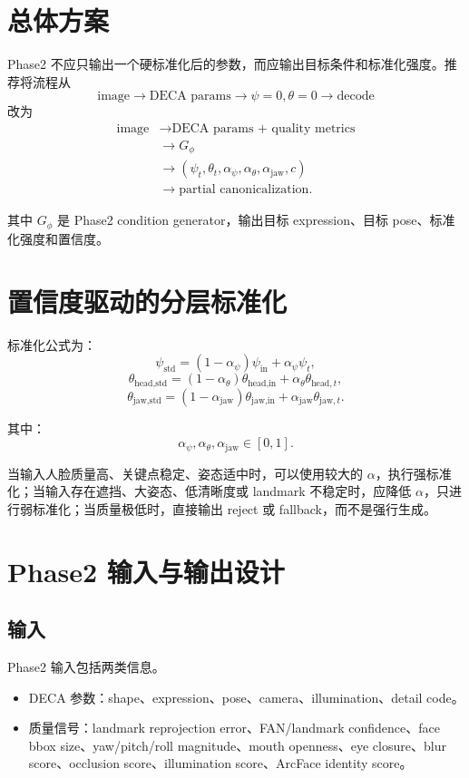 \documentclass[UTF8,12pt,fontset=fandol]{ctexart}
\begin{document}
\section{总体方案}

Phase2 不应只输出一个硬标准化后的参数，而应输出目标条件和标准化强度。推荐将流程从
\[
\text{image} \rightarrow \text{DECA params} \rightarrow \psi=0,\theta=0 \rightarrow \text{decode}
\]
改为
\begin{align*}
\text{image}
&\rightarrow \text{DECA params + quality metrics} \\
&\rightarrow G_{\phi} \\
&\rightarrow
(\psi_t,\theta_t,\alpha_{\psi},\alpha_{\theta},\alpha_{\text{jaw}},c) \\
&\rightarrow \text{partial canonicalization}.
\end{align*}

其中 \(G_{\phi}\) 是 Phase2 condition generator，输出目标 expression、目标 pose、标准化强度和置信度。

\section{置信度驱动的分层标准化}

标准化公式为：
\[
\psi_{\text{std}} =
(1-\alpha_{\psi})\psi_{\text{in}} +
\alpha_{\psi}\psi_t,
\]
\[
\theta_{\text{head,std}} =
(1-\alpha_{\theta})\theta_{\text{head,in}} +
\alpha_{\theta}\theta_{\text{head},t},
\]
\[
\theta_{\text{jaw,std}} =
(1-\alpha_{\text{jaw}})\theta_{\text{jaw,in}} +
\alpha_{\text{jaw}}\theta_{\text{jaw},t}.
\]

其中：
\[
\alpha_{\psi},\alpha_{\theta},\alpha_{\text{jaw}}\in[0,1].
\]

当输入人脸质量高、关键点稳定、姿态适中时，可以使用较大的 \(\alpha\)，执行强标准化；当输入存在遮挡、大姿态、低清晰度或 landmark 不稳定时，应降低 \(\alpha\)，只进行弱标准化；当质量极低时，直接输出 reject 或 fallback，而不是强行生成。

\section{Phase2 输入与输出设计}

\subsection{输入}

Phase2 输入包括两类信息。

\begin{itemize}
    \item DECA 参数：shape、expression、pose、camera、illumination、detail code。
    \item 质量信号：landmark reprojection error、FAN/landmark confidence、face bbox size、yaw/pitch/roll magnitude、mouth openness、eye closure、blur score、occlusion score、illumination score、ArcFace identity score。
\end{itemize}
\end{document}
